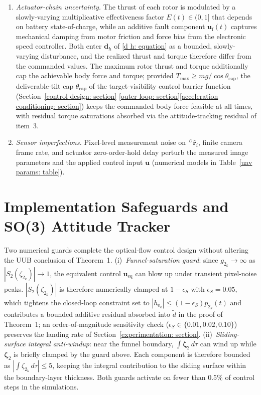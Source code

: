 \documentclass{IEEEtaes}
\begin{document}
\begin{enumerate}
    \item \emph{Actuator-chain uncertainty.} The thrust of each rotor is modulated by a slowly-varying multiplicative effectiveness factor $E(t)\in(0,1]$ that depends on battery state-of-charge, while an additive fault component $\boldsymbol{u}_\text{f}(t)$ captures mechanical damping from motor friction and force bias from the electronic speed controller. Both enter $\boldsymbol{d}_h$ of \eqref{d h: equation} as a bounded, slowly-varying disturbance, and the realized thrust and torque therefore differ from the commanded values. The maximum rotor thrust and torque additionally cap the achievable body force and torque; provided $T_\text{max}\ge mg/\cos\theta_\text{cap}$, the deliverable-tilt cap $\theta_\text{cap}$ of the target-visibility control barrier function (Section~\ref{control design: section}-\ref{outer loop: section}\ref{acceleration conditioning: section}) keeps the commanded body force feasible at all times, with residual torque saturations absorbed via the attitude-tracking residual of item~3.
    \item \emph{Sensor imperfections.} Pixel-level measurement noise on $\,^\mathcal{C}\hat{\boldsymbol{r}}_i$, finite camera frame rate, and actuator zero-order-hold delay perturb the measured image parameters and the applied control input $\boldsymbol{u}$ (numerical models in Table~\ref{uav params: table}).
\end{enumerate}

\section{Implementation Safeguards and SO(3) Attitude Tracker} \label{implementation appendix: section}
Two numerical guards complete the optical-flow control design without altering the UUB conclusion of Theorem~1. (i)~\emph{Funnel-saturation guard}: since $g_{2_k}\to\infty$ as $|S_2(\zeta_{2_k})|\to 1$, the equivalent control $\boldsymbol{u}_\text{eq}$ can blow up under transient pixel-noise peaks. $|S_2(\zeta_{2_k})|$ is therefore numerically clamped at $1-\epsilon_S$ with $\epsilon_S=0.05$, which tightens the closed-loop constraint set to $|h_{\text{e}_k}|\le(1-\epsilon_S)p_{2_k}(t)$ and contributes a bounded additive residual absorbed into $\tilde{d}$ in the proof of Theorem~1; an order-of-magnitude sensitivity check ($\epsilon_S\in\{0.01,0.02,0.10\}$) preserves the landing rate of Section~\ref{experimentation: section}. (ii)~\emph{Sliding-surface integral anti-windup}: near the funnel boundary, $\int\boldsymbol{\zeta}_2\,d\tau$ can wind up while $\boldsymbol{\zeta}_2$ is briefly clamped by the guard above. Each component is therefore bounded as $|\!\int\!\zeta_{2_k}\,d\tau|\le 5$, keeping the integral contribution to the sliding surface within the boundary-layer thickness. Both guards activate on fewer than $0.5\%$ of control steps in the simulations.
\end{document}
